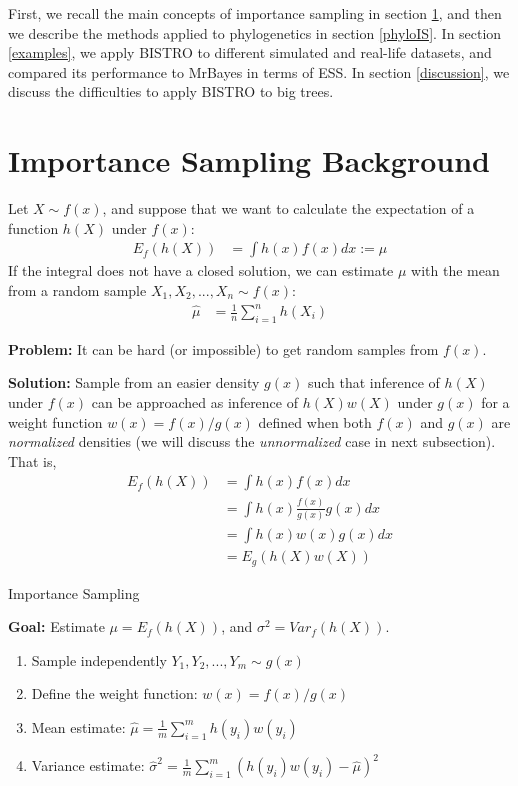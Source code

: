 \documentclass[conference]{IEEEtran}
\begin{document}
First, we recall the main concepts of importance sampling in section
\ref{background}, and then we describe the methods applied to
phylogenetics in section \ref{phyloIS}. In section \ref{examples}, we
apply BISTRO to different simulated and real-life datasets, and
compared its performance to MrBayes in terms of ESS. In section
\ref{discussion}, we discuss the difficulties to apply BISTRO to big
trees.


\section{Importance Sampling Background}
\label{background}

Let $X \sim f(x)$, and suppose that we want to calculate the
expectation of a function $h(X)$ under $f(x)$:
\begin{align*}
E_f(h(X)) &= \int h(x) f(x) dx := \mu
\end{align*}
If the integral does not have a closed solution, we can estimate $\mu$
with the mean from a random sample $X_1,X_2,...,X_n \sim f(x)$:
\begin{align*}
\hat{\mu} &= \frac{1}{n} \sum_{i=1}^n h(X_i)
\end{align*}

\textbf{Problem:} It can be hard (or impossible) to get random samples
from $f(x)$.


\textbf{Solution:} Sample from an easier density $g(x)$ such that inference of $h(X)$ under $f(x)$ can be approached as
inference of $h(X)w(X)$ under $g(x)$ for a weight function
$w(x)=f(x)/g(x)$ defined when both $f(x)$ and $g(x)$ are \textit{normalized} densities (we will discuss the
    \textit{unnormalized} case in next subsection). That is,
\begin{align*}
E_f(h(X)) &= \int h(x) f(x) dx \\
&= \int h(x) \frac{f(x)}{g(x)} g(x) dx \\
&= \int h(x) w(x) g(x) dx \\
&= E_g(h(X)w(X))
\end{align*}

\begin{algorithm}
\caption{Importance Sampling}
\textbf{Goal:} Estimate $\mu = E_f(h(X))$, and $\sigma^2 = Var_f(h(X))$.
\begin{enumerate}
\item{Sample independently $Y_1,Y_2,...,Y_m \sim g(x)$}
\item{Define the weight function: $w(x) = f(x)/g(x)$}
\item{Mean estimate: $\hat{\mu} = \frac{1}{m} \sum_{i=1}^m
    h(y_i)w(y_i)$}
\item{Variance estimate: $\hat{\sigma}^2 = \frac{1}{m} \sum_{i=1}^m
    (h(y_i)w(y_i) - \hat{\mu})^2$}
\end{enumerate}
\end{algorithm}
\end{document}
